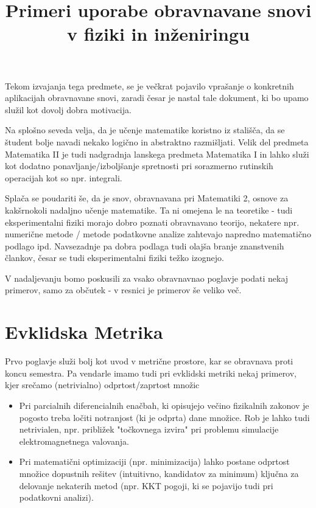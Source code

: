 \documentclass[12pt]{article}
\title{Primeri uporabe obravnavane snovi v fiziki in inženiringu}
\author{} %
\date{}   %
\begin{document}
\maketitle

\section*{}
Tekom izvajanja tega predmete, se je večkrat pojavilo vprašanje o konkretnih aplikacijah obravnavane snovi, zaradi česar je nastal tale dokument, ki bo upamo služil kot dovolj dobra motivacija.

Na splošno seveda velja, da je učenje matematike koristno iz stališča, da se študent bolje navadi nekako logično in abstraktno razmišljati. Velik del predmeta Matematika II je tudi nadgradnja lanskega predmeta Matematika I in lahko služi kot dodatno ponavljanje/izboljšanje spretnosti pri sorazmerno rutinskih operacijah kot so npr. integrali.

Splača se poudariti še, da je snov, obravnavana pri Matematiki 2, osnove za kakšrnokoli nadaljno učenje matematike. Ta ni omejena le na teoretike - tudi eksperimentalni fiziki morajo dobro poznati obravnavano teorijo, nekatere npr. numerične metode / metode podatkovne analize zahtevajo napredno matematično podlago ipd. Navsezadnje pa dobra podlaga tudi olajša branje znanstvenih člankov, česar se tudi eksperimentalni fiziki težko izognejo.

V nadaljevanju bomo poskusili za vsako obravnavnao poglavje podati nekaj primerov, samo za občutek - v resnici je primerov še veliko več.

\section*{Evklidska Metrika}
Prvo poglavje služi bolj kot uvod v metrične prostore, kar se obravnava proti koncu semestra. Pa vendarle imamo tudi pri evklidski metriki nekaj primerov, kjer srečamo (netrivialno) odprtost/zaprtost množic
\begin{itemize}[leftmargin=1.5em]
    \item Pri parcialnih diferencialnih enačbah, ki opisujejo večino fizikalnih zakonov je pogosto treba ločiti notranjost (ki je odprta) dane množice. Rob je lahko tudi netrivialen, npr. približek "{}točkovnega izvira"{} pri problemu simulacije elektromagnetnega valovanja.
    \item Pri matematični optimizaciji (npr. minimizacija) lahko postane odprtost množice dopustnih rešitev (intuitivno, kandidatov za minimum) ključna za delovanje nekaterih metod (npr. KKT pogoji, ki se pojavijo tudi pri podatkovni analizi).
\end{itemize}
\end{document}
